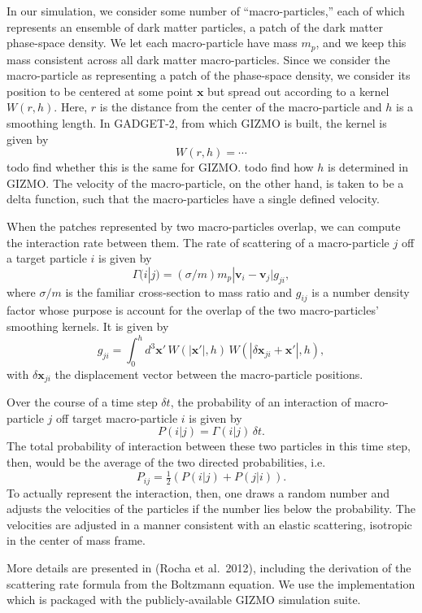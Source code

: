 In our simulation, we consider some number of ``macro-particles,'' each
of which represents an ensemble of dark matter particles, a patch of the
dark matter phase-space density. We let each macro-particle have mass
\(m_p\), and we keep this mass consistent across all dark matter
macro-particles. Since we consider the macro-particle as representing a
patch of the phase-space density, we consider its position to be
centered at some point \(\mathbf{x}\) but spread out according to a
kernel \(W(r,h)\). Here, \(r\) is the distance from the center of the
macro-particle and \(h\) is a smoothing length. In GADGET-2, from which
GIZMO is built, the kernel is given by \[ W(r,h) = \cdots \] todo find
whether this is the same for GIZMO. todo find how \(h\) is determined in
GIZMO. The velocity of the macro-particle, on the other hand, is taken
to be a delta function, such that the macro-particles have a single
defined velocity.

When the patches represented by two macro-particles overlap, we can
compute the interaction rate between them. The rate of scattering of a
macro-particle \(j\) off a target particle \(i\) is given by
\[ \Gamma(i|j) = (\sigma/m) m_p |\mathbf{v}_i - \mathbf{v}_j| g_{ji}, \]
where \(\sigma/m\) is the familiar cross-section to mass ratio and
\(g_{ij}\) is a number density factor whose purpose is account for the
overlap of the two macro-particles' smoothing kernels. It is given by
\[ g_{ji} = \int_{0}^{h} d^3 \mathbf{x}' \, W(|\mathbf{x}'|, h) \, W(|\delta \mathbf{x}_{ji} + \mathbf{x}'|, h), \]
with \(\delta \mathbf{x}_{ji}\) the displacement vector between the
macro-particle positions.

Over the course of a time step \(\delta t\), the probability of an
interaction of macro-particle \(j\) off target macro-particle \(i\) is
given by \[ P(i|j) = \Gamma(i|j) \, \delta t. \] The total probability
of interaction between these two particles in this time step, then,
would be the average of the two directed probabilities, i.e.
\[ P_{ij} = \tfrac{1}{2} \left( P(i|j) + P(j|i) \right). \] To actually
represent the interaction, then, one draws a random number and adjusts
the velocities of the particles if the number lies below the
probability. The velocities are adjusted in a manner consistent with an
elastic scattering, isotropic in the center of mass frame.

More details are presented in (Rocha et al.~2012), including the
derivation of the scattering rate formula from the Boltzmann equation.
We use the implementation which is packaged with the publicly-available
GIZMO simulation suite.
